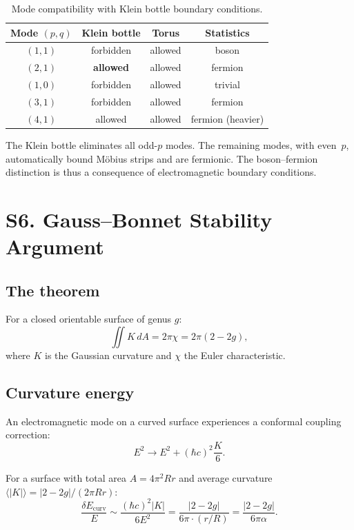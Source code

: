 \documentclass[11pt,a4paper]{article}
\begin{document}
\begin{table}[h]
\centering
\begin{tabular}{@{}cccc@{}}
\toprule
Mode $(p,q)$ & Klein bottle & Torus & Statistics \\
\midrule
$(1,1)$ & forbidden & allowed & boson \\
$(2,1)$ & \textbf{allowed} & allowed & fermion \\
$(1,0)$ & forbidden & allowed & trivial \\
$(3,1)$ & forbidden & allowed & fermion \\
$(4,1)$ & allowed & allowed & fermion (heavier) \\
\bottomrule
\end{tabular}
\caption{Mode compatibility with Klein bottle boundary conditions.}
\label{tab:klein-modes}
\end{table}

The Klein bottle eliminates all odd-$p$ modes. The remaining modes, with even~$p$, automatically bound M\"obius strips and are fermionic. The boson--fermion distinction is thus a consequence of electromagnetic boundary conditions.

\section{S6. Gauss--Bonnet Stability Argument}
\label{sec:S6}

\subsection{The theorem}

For a closed orientable surface of genus $g$:
\begin{equation}
  \iint K\, dA = 2\pi\chi = 2\pi(2 - 2g),
\end{equation}
where $K$ is the Gaussian curvature and $\chi$ the Euler characteristic.

\subsection{Curvature energy}

An electromagnetic mode on a curved surface experiences a conformal coupling correction:
\begin{equation}
  E^2 \to E^2 + (\hbar c)^2\frac{K}{6}.
\end{equation}

For a surface with total area $A = 4\pi^2 Rr$ and average curvature $\langle |K| \rangle = |2 - 2g|/(2\pi Rr)$:
\begin{equation}
  \frac{\delta E_{\text{curv}}}{E} \sim \frac{(\hbar c)^2 |K|}{6E^2} = \frac{|2 - 2g|}{6\pi \cdot (r/R)} = \frac{|2 - 2g|}{6\pi\alpha}.
\end{equation}
\end{document}
